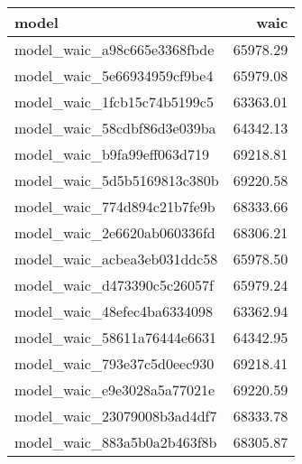 
\begin{tabular}{lr}
\toprule
model & waic\\
\midrule
model\_waic\_a98c665e3368fbde & 65978.29\\
model\_waic\_5e66934959cf9be4 & 65979.08\\
model\_waic\_1fcb15c74b5199c5 & 63363.01\\
model\_waic\_58cdbf86d3e039ba & 64342.13\\
model\_waic\_b9fa99eff063d719 & 69218.81\\
\addlinespace
model\_waic\_5d5b5169813c380b & 69220.58\\
model\_waic\_774d894c21b7fe9b & 68333.66\\
model\_waic\_2e6620ab060336fd & 68306.21\\
model\_waic\_acbea3eb031ddc58 & 65978.50\\
model\_waic\_d473390c5c26057f & 65979.24\\
\addlinespace
model\_waic\_48efec4ba6334098 & 63362.94\\
model\_waic\_58611a76444e6631 & 64342.95\\
model\_waic\_793e37c5d0eec930 & 69218.41\\
model\_waic\_e9e3028a5a77021e & 69220.59\\
model\_waic\_23079008b3ad4df7 & 68333.78\\
\addlinespace
model\_waic\_883a5b0a2b463f8b & 68305.87\\
\bottomrule
\end{tabular}
